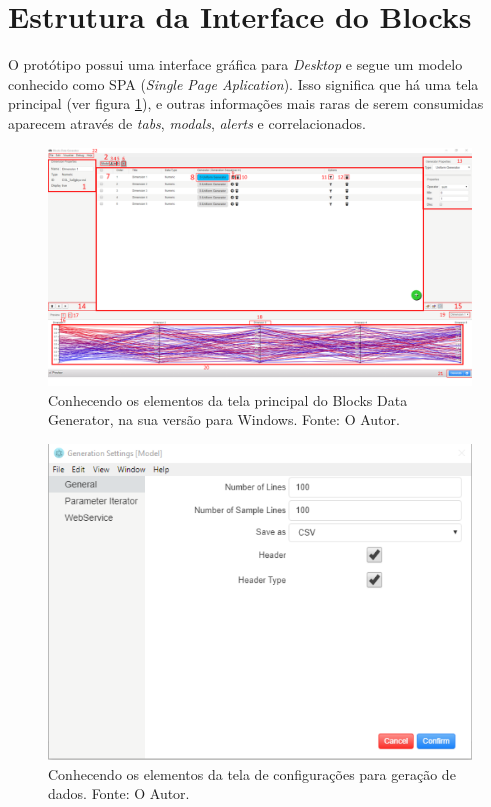 \documentclass[
	12pt,				%
	openright,			%
	twoside,			%
	a4paper,			%
	english,			%
	brazil				%
	]{abntex2}
\begin{document}
	\section{Estrutura da Interface do Blocks}
		O protótipo possui uma interface gráfica para \emph{Desktop} e segue um modelo conhecido como SPA (\emph{Single Page Aplication}).
		Isso significa que há uma tela principal (ver figura \ref{fig:telaPrincipal}), e outras informações mais raras de serem consumidas aparecem através de \emph{tabs}, \emph{modals}, \emph{alerts} e correlacionados.
		\begin{figure}[h]
			\centering
			\includegraphics[width=\linewidth]{./figures/prototipo/telaprincipalmarcada.png}
			\caption{Conhecendo os elementos da tela principal do Blocks Data Generator, na sua versão para Windows. Fonte: O Autor.}
			\label{fig:telaPrincipal}
		\end{figure}
		\begin{figure}[h]
			\centering
			\includegraphics[width=\linewidth]{./figures/prototipo/generationSettings.png}
			\caption{Conhecendo os elementos da tela de configurações para geração de dados. Fonte: O Autor.}
			\label{fig:generationSettings}
		\end{figure}
\end{document}
